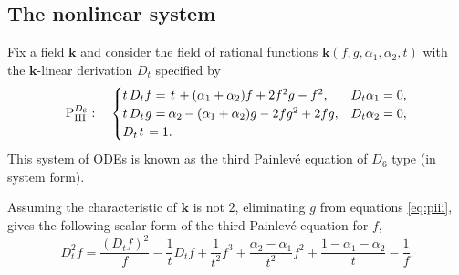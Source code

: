 \documentclass[a4paper,reqno]{amsart}
\numberwithin{equation}{section}
\numberwithin{figure}{section}
\theoremstyle{remark}
\newcommand\Pthree{\textrm{P}_{\textrm{III}}}
\begin{document}
\subsection{The nonlinear system}
Fix a field $\mathbf{k}$ and consider the field of rational functions $\mathbf{k}(f,g,\alpha_1,\alpha_2,t)$ with the $\mathbf{k}$-linear derivation $D_t$ specified by
 \begin{equation}\label{eq:piii}
 \Pthree^{D_6}:\quad           \begin{cases}
       t\, D_t f=\hspace{0.4mm}t\hspace{0.4mm}+(\alpha_1+\alpha_2)f+2f^2g-f^2, &   D_t \alpha_1=0, \\
  t\, D_t \hspace{0.2mm}g\hspace{0.1mm}=\hspace{-0.2mm} \alpha_2\hspace{-0.2mm}-(\alpha_1+\alpha_2)g-2fg^2+2 fg, &   D_t \alpha_2=0, \\
        D_t \hspace{0.4mm}t\hspace{0.4mm}=1. &    \\ 
    \end{cases}
    \end{equation}
This system of ODEs is known as the third Painlev\'e equation of $D_6$ type (in system form).

Assuming the characteristic of $\mathbf{k}$ is not $2$, eliminating $g$ from equations \eqref{eq:piii}, gives the following scalar form of the third Painlev\'e equation for $f$,
\begin{equation*}
    D_t^2f=\frac{(D_tf)^2}{f}-\frac{1}{t}D_tf+\frac{1}{t^2}f^3+\frac{\alpha_2-\alpha_1}{t^2}f^2+\frac{1-\alpha_1-\alpha_2}{t}-\frac{1}{f}.
\end{equation*}
\end{document}
